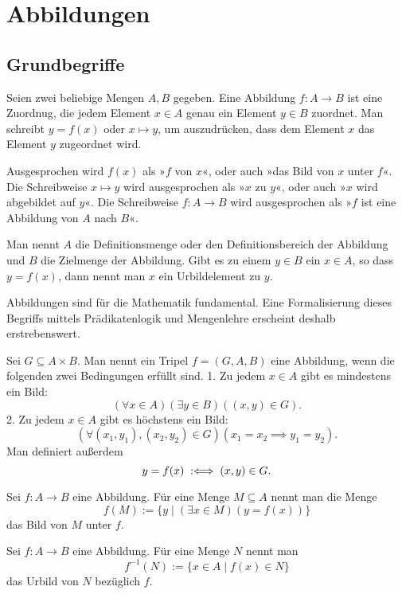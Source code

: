 \newpage
\section{Abbildungen}
\subsection{Grundbegriffe}
Seien zwei beliebige Mengen $A,B$ gegeben. Eine Abbildung
$f\colon A\to B$ ist eine Zuordnug, die jedem Element $x\in A$
genau ein Element $y\in B$ zuordnet. Man schreibt $y=f(x)$
oder $x\mapsto y$, um auszudrücken, dass dem Element $x$
das Element $y$ zugeordnet wird.

Ausgesprochen wird $f(x)$ als »$f$ von $x$«, oder auch
»das Bild von $x$ unter $f$«. Die Schreibweise $x\mapsto y$
wird ausgesprochen als »$x$ zu $y$«, oder auch
»$x$ wird abgebildet auf $y$«. Die Schreibweise
$f\colon A\to B$ wird ausgesprochen als »$f$ ist eine
Abbildung von $A$ nach $B$«.

Man nennt $A$ die Definitionsmenge oder den Definitionsbereich
der Abbildung und $B$ die Zielmenge der Abbildung. Gibt es zu
einem $y\in B$ ein $x\in A$, so dass $y=f(x)$, dann nennt man
$x$ ein Urbildelement zu $y$.

Abbildungen sind für die Mathematik fundamental. Eine
Formalisierung dieses Begriffs mittels Prädikatenlogik
und Mengenlehre erscheint deshalb erstrebenswert.

\begin{Definition}[Abbildung]
Sei $G\subseteq A\times B$. Man nennt ein Tripel $f=(G,A,B)$ eine
Abbildung, wenn die folgenden zwei Bedingungen erfüllt sind.
1. Zu jedem $x\in A$ gibt es mindestens ein Bild:
\[(\forall x\in A)(\exists y\in B)((x,y)\in G).\]
2. Zu jedem $x\in A$ gibt es höchstens ein Bild:
\[(\forall (x_1,y_1),(x_2,y_2)\in G)(x_1=x_2\implies y_1=y_2).\]
Man definiert außerdem
\[y=f(x)\;:\Longleftrightarrow\; (x,y)\in G.\]
\end{Definition}

\begin{Definition}[Bildmenge]
Sei $f\colon A\to B$ eine Abbildung.
Für eine Menge $M\subseteq A$ nennt man die Menge
\[f(M) := \{y\mid(\exists x\in M)(y=f(x))\}\]
das Bild von $M$ unter $f$.
\end{Definition}

\begin{Definition}[Urbildmenge]
Sei $f\colon A\to B$ eine Abbildung. Für eine Menge $N$ nennt man
\[f^{-1}(N) := \{x\in A\mid f(x)\in N\}\]
das Urbild von $N$ bezüglich $f$.
\end{Definition}

